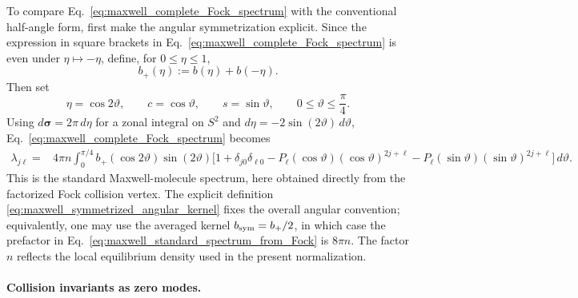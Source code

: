 \documentclass[11pt,oneside]{article}
\numberwithin{equation}{section}
\theoremstyle{definition}
\begin{document}
To compare Eq.~\eqref{eq:maxwell_complete_Fock_spectrum} with the conventional half-angle form, first make the angular symmetrization explicit.  Since the expression in square brackets in Eq.~\eqref{eq:maxwell_complete_Fock_spectrum} is even under $\eta\mapsto-\eta$, define, for $0\leq\eta\leq1$,
\begin{equation}
b_+(\eta):=b(\eta)+b(-\eta).
\label{eq:maxwell_symmetrized_angular_kernel}
\end{equation}
Then set
\begin{equation}
\eta=\cos2\vartheta,
\qquad
c=\cos\vartheta,
\qquad
s=\sin\vartheta,
\qquad
0\leq\vartheta\leq\frac{\pi}{4}.
\end{equation}
Using $d\bm\sigma=2\pi\,d\eta$ for a zonal integral on $S^2$ and $d\eta=-2\sin(2\vartheta)\,d\vartheta$, Eq.~\eqref{eq:maxwell_complete_Fock_spectrum} becomes
\begin{equation}
\begin{aligned}
\lambda_{j\ell}
={}&
4\pi n
\int_0^{\pi/4}
b_+(\cos2\vartheta)\sin(2\vartheta)
\Big[
1+\delta_{j0}\delta_{\ell0}
-
P_\ell(\cos\vartheta)
(\cos\vartheta)^{2j+\ell}
-
P_\ell(\sin\vartheta)
(\sin\vartheta)^{2j+\ell}
\Big]
\,d\vartheta .
\end{aligned}
\label{eq:maxwell_standard_spectrum_from_Fock}
\end{equation}
This is the standard Maxwell-molecule spectrum, here obtained directly
from the factorized Fock collision vertex.  The explicit definition
\eqref{eq:maxwell_symmetrized_angular_kernel} fixes the overall angular convention; equivalently, one may use the averaged kernel $b_{\rm sym}=b_+/2$, in which case the prefactor in Eq.~\eqref{eq:maxwell_standard_spectrum_from_Fock} is $8\pi n$.  The factor $n$ reflects the local equilibrium density used in the present normalization.

\paragraph{Collision invariants as zero modes.}
\end{document}
